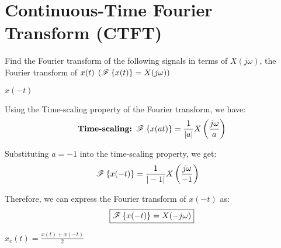 \documentclass[a4paper, 10pt]{article}
\begin{document}
\subject[2110203 - Computer Engineering Mathematics II]


\section{Continuous-Time Fourier Transform (CTFT)}



\begin{problem}
    Find the Fourier transform of the following signals in terms of \( X(j\omega) \),
    the Fourier transform of \( x(t) \; \left( \mathscr{F} \left\{ x(t) \right\} = X(j\omega) \right) \)
\end{problem}

\begin{subproblems}[start=1]
    \item \( x(-t) \)
\end{subproblems}

\begin{solution}
Using the Time-scaling property of the Fourier transform, we have:
\[
    \textbf{Time-scaling: } \mathscr{F} \left\{ x(at) \right\} = \frac{1}{|a|} X\left( \frac{j\omega}{a} \right)
\]

Substituting \( a = -1 \) into the time-scaling property, we get:
\begin{align*}  
    \mathscr{F} \left\{ x(-t) \right\} &= \frac{1}{|-1|} X\left( \frac{j\omega}{-1} \right)
\end{align*}

Therefore, we can express the Fourier transform of \( x(-t) \) as:
\[ \boxed{
    \mathscr{F} \left\{ x(-t) \right\} = X(-j\omega)
} \]
\end{solution}


\begin{subproblems}[resume]
    \item \( x_e(t) = \frac{x(t) + x(-t)}{2} \)
\end{subproblems}
\end{document}
